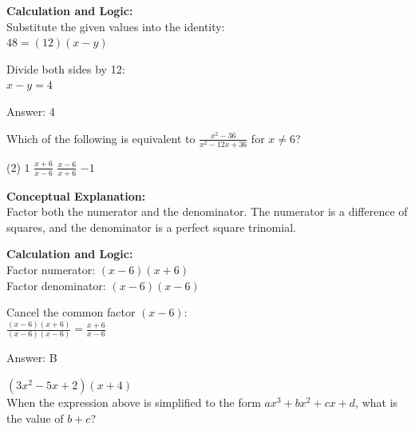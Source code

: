 \documentclass[11pt,paper=a4,answers]{exam}
\begin{document}
\begin{questions}
\begin{solution}
\textbf{Calculation and Logic:} \\
Substitute the given values into the identity: \\
$48 = (12)(x - y)$

\vspace{10pt}

Divide both sides by 12: \\
$x - y = 4$

\vspace{25pt}

Answer: \colorbox{yellow!100}{4}
\end{solution}

\vspace{40pt}

\question
Which of the following is equivalent to $\frac{x^2 - 36}{x^2 - 12x + 36}$ for $x \neq 6$?
\begin{tasks}(2)
    \task $1$
    \task $\frac{x + 6}{x - 6}$
    \task $\frac{x - 6}{x + 6}$
    \task $-1$
\end{tasks}

\begin{solution}
\textbf{Conceptual Explanation:} \\
Factor both the numerator and the denominator. The numerator is a difference of squares, and the denominator is a perfect square trinomial.

\vspace{20pt}

\textbf{Calculation and Logic:} \\
Factor numerator: $(x - 6)(x + 6)$ \\
Factor denominator: $(x - 6)(x - 6)$

\vspace{10pt}

Cancel the common factor $(x - 6)$: \\
$\frac{(x - 6)(x + 6)}{(x - 6)(x - 6)} = \frac{x + 6}{x - 6}$

\vspace{25pt}

Answer: \colorbox{yellow!100}{B}
\end{solution}

\vspace{40pt}

\question
$(3x^2 - 5x + 2)(x + 4)$ \\
When the expression above is simplified to the form $ax^3 + bx^2 + cx + d$, what is the value of $b + c$?


\end{questions}
\end{document}
